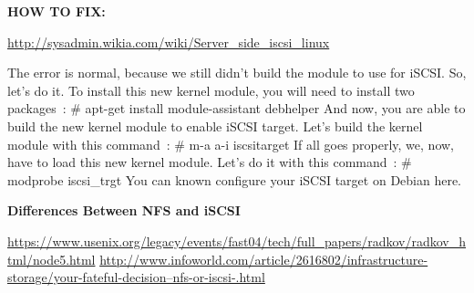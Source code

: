 \documentclass[letterpaper,10pt,english]{sphinxmanual}
\begin{document}
\textbf{HOW TO FIX:}

\href{http://sysadmin.wikia.com/wiki/Server\_side\_iscsi\_linux}{http://sysadmin.wikia.com/wiki/Server\_side\_iscsi\_linux}

The error is normal, because we still didn't build the module to use for iSCSI. So, let's do it. To install this new kernel module, you will need to install two packages :
\# apt-get install module-assistant debhelper
And now, you are able to build the new kernel module to enable iSCSI target. Let's build the kernel module with this command :
\# m-a a-i iscsitarget
If all goes properly, we, now, have to load this new kernel module. Let's do it with this command :
\# modprobe iscsi\_trgt
You can known configure your iSCSI target on Debian here.

\textbf{Differences Between NFS and iSCSI}

\href{https://www.usenix.org/legacy/events/fast04/tech/full\_papers/radkov/radkov\_html/node5.html}{https://www.usenix.org/legacy/events/fast04/tech/full\_papers/radkov/radkov\_html/node5.html}
\href{http://www.infoworld.com/article/2616802/infrastructure-storage/your-fateful-decision--nfs-or-iscsi-.html}{http://www.infoworld.com/article/2616802/infrastructure-storage/your-fateful-decision--nfs-or-iscsi-.html}
\end{document}
